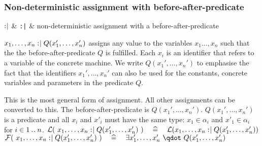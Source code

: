 \begin{samepage}
\subsubsection{Non-deterministic assignment with before-after-predicate}
\label{nondeterministic_assignments}
\begin{rrnames}
  $\mathrel{:\mkern1mu\mid}$ & \texttt{:|} & non-deterministic assignment with a before-after-predicate
\end{rrnames}
\begin{rodinrefentry}
  \rrdesc
    $x_1,\ldots,x_n \mathrel{:\mkern1mu\mid} Q(x_1',\ldots,x_n')$
    assigns any value to the variables $x_1\ldots,x_n$ such that the the
    before-after-predicate $Q$ is fulfilled.
    Each $x_i$ is an identifier that refers to a variable of the concrete machine.
    We write $Q(x_1',\ldots,x_n')$ to emphasise the fact that the identifiers $x_1',\ldots,x_n'$
    can also be used for the constants, concrete variables and parameters in the predicate $Q$.

    This is the most general form of assignment. All other assignments can be converted to this.
  \rrdef
    The before-after-predicate is $Q(x_1',\ldots,x_n')$.
  \rrtypes
    $Q(x_1',\ldots,x_n')$ is a predicate and all $x_i$ and $x'_i$ must have the same type:
    $x_1\in\alpha_i$ and $x'_1\in\alpha_i$ for $i\in 1\mathbin{.\mkern1mu.} n$.
  \rrwd
    $\mathcal{L}(~x_1,\ldots,x_n \mathrel{:\mkern1mu\mid} Q(x_1',\ldots,x_n')~)
    \quad\mathrel{\widehat=}\quad
    \mathcal{L}(x_1,\ldots,x_n \mathrel{:\mkern1mu\mid} Q(x_1',\ldots,x_n'))$
  \rrfis
    $\actfis(~x_1,\ldots,x_n \bcmsuch Q(x_1',\ldots,x_n')~)
      \quad\defi\quad
      \exists x_1',\ldots,x_n' ~\qdot~ Q(x_1',\ldots,x_n')$
\end{rodinrefentry}
\end{samepage}

